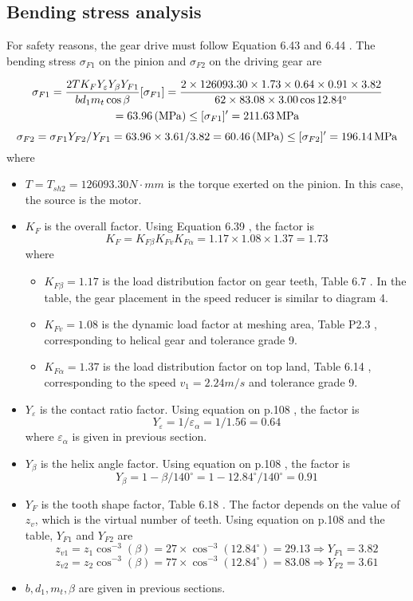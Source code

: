 \subsection{Bending stress analysis}
For safety reasons, the gear drive must follow Equation 6.43 and 6.44 \cite{tk1}. The bending stress $ \sigma_{F1} $ on the pinion and $ \sigma_{F2} $ on the driving gear are

\begin{multline*}
\sigma_{F1} = \dfrac{2TK_FY_\varepsilon Y_\beta Y_{F1}}{bd_1m_t\cos\beta} [\sigma_{F1}]= \dfrac{2\times 126093.30 \times 1.73 \times 0.64 \times 0.91 \times 3.82}{62 \times 83.08 \times 3.00 \cos 12.84^\circ}\\
= 63.96 \, (\mathrm{MPa}) \leq [\sigma_{F1}]' = 211.63 \, \mathrm{MPa}
\end{multline*}
\[\sigma_{F2} = \sigma_{F1}Y_{F2}/Y_{F1} = {63.96 \times 3.61}/3.82 = 60.46 \, (\mathrm{MPa}) \leq [\sigma_{F2}]' = 196.14 \, \mathrm{MPa}\]
where
\begin{itemize}
	\item $ T=T_{sh2}=126093.30\unit{N\cdot mm} $ is the torque exerted on the pinion. In this case, the source is the motor.
	\item $ K_F $ is the overall factor. Using Equation 6.39 \cite{tk1}, the factor is
	\[ K_F = K_{F\beta}K_{Fv}K_{F\alpha} = 1.17 \times 1.08 \times 1.37 = 1.73 \]
	where
	\begin{itemize}
		\item $ K_{F\beta} = 1.17 $ is the load distribution factor on gear teeth, Table 6.7 \cite{tk1}. In the table, the gear placement in the speed reducer is similar to diagram 4.
		\item $ K_{Fv} = 1.08 $ is the dynamic load factor at meshing area, Table P2.3 \cite{tk1}, corresponding to helical gear and tolerance grade 9.
		\item $ K_{F\alpha} = 1.37 $ is the load distribution factor on top land, Table 6.14 \cite{tk1}, corresponding to the speed $ v_1=2.24 \unit{m/s} $ and tolerance grade 9.
	\end{itemize}
	\item $ Y_\varepsilon $ is the contact ratio factor. Using equation on p.108 \cite{tk1}, the factor is
	\[ Y_\varepsilon = 1/\varepsilon_\alpha = 1/1.56 = 0.64 \]
	where $ \varepsilon_\alpha $ is given in previous section.
	\item $ Y_\beta $ is the helix angle factor. Using equation on p.108 \cite{tk1}, the factor is
	\[ Y_\beta = 1-{\beta}/{140^\circ}=  1-{12.84^\circ}/{140^\circ}= 0.91 \]
	\item $ Y_F $ is the tooth shape factor, Table 6.18 \cite{tk1}. The factor depends on the value of $ z_v $, which is the virtual number of teeth. Using equation on p.108 \cite{tk1} and the table, $ Y_{F1} $ and $ Y_{F2} $ are
	\[ z_{v1} = z_1\cos^{-3}(\beta) = 27\times\cos^{-3}(12.84^\circ) = 29.13\Rightarrow Y_{F1} = 3.82\]
	\[ z_{v2} = z_2\cos^{-3}(\beta) = 77\times\cos^{-3}(12.84^\circ) = 83.08\Rightarrow Y_{F2} = 3.61\]
	\item $ b,d_1,m_t,\beta $ are given in previous sections.
\end{itemize}


